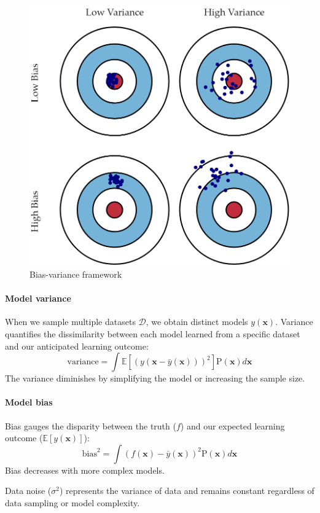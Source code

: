 \begin{figure}[H]
    \centering
    \includegraphics[width=0.5\linewidth]{images/bvf.png}
    \caption{Bias-variance framework}
\end{figure}

\paragraph*{Model variance}
When we sample multiple datasets $\mathcal{D}$, we obtain distinct models $y(\textbf{x})$. 
Variance quantifies the dissimilarity between each model learned from a specific dataset and our anticipated learning outcome:
\[\text{variance}=\int \mathbb{E}\left[ \left( y(\textbf{x}-\bar{y}(\textbf{x})) \right)^2 \right]\text{P}(\textbf{x})d\textbf{x}\]
The variance diminishes by simplifying the model or increasing the sample size.

\paragraph*{Model bias}
Bias gauges the disparity between the truth ($f$) and our expected learning outcome ($\mathbb{E}\left[y(\textbf{x})\right]$):
\[\text{bias}^2=\int \left(f(\textbf{x})-\bar{y}(\textbf{x})\right)^2 \text{P}(\textbf{x})d\textbf{x}\]
Bias decreases with more complex models.
\begin{definition}
    Data noise ($\sigma^2$) represents the variance of data and remains constant regardless of data sampling or model complexity.
\end{definition}

